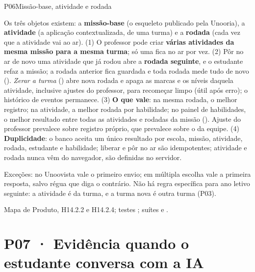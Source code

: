 \begin{resposta}{P06}{Missão-base, atividade e rodada}{\implementado}
\begin{campos}
  \item[Hoje] Os três objetos existem: a \textbf{missão-base} (o esqueleto
    publicado pela Unooria), a \textbf{atividade} (a aplicação
    contextualizada, de uma turma) e a \textbf{rodada} (cada vez que a
    atividade vai ao ar). (1) O professor pode criar \textbf{várias atividades
    da mesma missão para a mesma turma}; só uma fica no ar por vez.
    (2) Pôr no ar de novo uma atividade que já rodou abre a \textbf{rodada
    seguinte}, e o estudante refaz a missão; a rodada anterior fica guardada
    e toda rodada mede tudo de novo (). \emph{Zerar a turma}
    () abre nova rodada e apaga as marcas e os níveis daquela
    atividade, inclusive ajustes do professor, para recomeçar limpo (útil
    após erro); o histórico de eventos permanece. (3) \textbf{O que vale}: na
    mesma rodada, o melhor registro; na atividade, a melhor rodada por
    habilidade; no painel de habilidades, o melhor resultado entre todas as
    atividades e rodadas da missão (). Ajuste do professor
    prevalece sobre registro próprio, que prevalece sobre o da equipe.
    (4) \textbf{Duplicidade}: o banco aceita um único resultado por escola,
    missão, atividade, rodada, estudante e habilidade; liberar e pôr no ar são
    idempotentes; atividade e rodada nunca vêm do navegador, são definidas no
    servidor.
  \item[Limitações] Exceções: no Unoovista vale o primeiro envio; em
    múltipla escolha vale a primeira resposta, salvo régua que diga o
    contrário. Não há regra específica para ano letivo seguinte: a atividade
    é da turma, e a turma nova é outra turma (P03).
  \item[Evidência] Mapa de Produto, H14.2.2 e H14.2.4; testes
    ; suítes
     e
    .
\end{campos}
\end{resposta}

\section{P07 · Evidência quando o estudante conversa com a IA}
\label{sec:p07}

